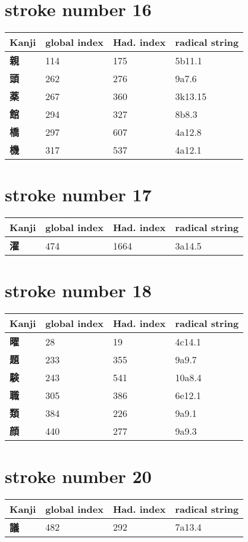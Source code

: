 \section{stroke number 16}
  \begin{longtable}[c]{llll}
    \bfseries Kanji & \bfseries global index & \bfseries Had. index & \bfseries radical string\\\hline\endhead
    \bfseries 親 & 114 & 175 & 5b11.1\\
    \bfseries 頭 & 262 & 276 & 9a7.6\\
    \bfseries 薬 & 267 & 360 & 3k13.15\\
    \bfseries 館 & 294 & 327 & 8b8.3\\
    \bfseries 橋 & 297 & 607 & 4a12.8\\
    \bfseries 機 & 317 & 537 & 4a12.1\\
  \end{longtable}
\section{stroke number 17}
  \begin{longtable}[c]{llll}
    \bfseries Kanji & \bfseries global index & \bfseries Had. index & \bfseries radical string\\\hline\endhead
    \bfseries 濯 & 474 & 1664 & 3a14.5\\
  \end{longtable}
\section{stroke number 18}
  \begin{longtable}[c]{llll}
    \bfseries Kanji & \bfseries global index & \bfseries Had. index & \bfseries radical string\\\hline\endhead
    \bfseries 曜 & 28 & 19 & 4c14.1\\
    \bfseries 題 & 233 & 355 & 9a9.7\\
    \bfseries 験 & 243 & 541 & 10a8.4\\
    \bfseries 職 & 305 & 386 & 6e12.1\\
    \bfseries 類 & 384 & 226 & 9a9.1\\
    \bfseries 顔 & 440 & 277 & 9a9.3\\
  \end{longtable}
\section{stroke number 20}
  \begin{longtable}[c]{llll}
    \bfseries Kanji & \bfseries global index & \bfseries Had. index & \bfseries radical string\\\hline\endhead
    \bfseries 議 & 482 & 292 & 7a13.4\\
  \end{longtable}
